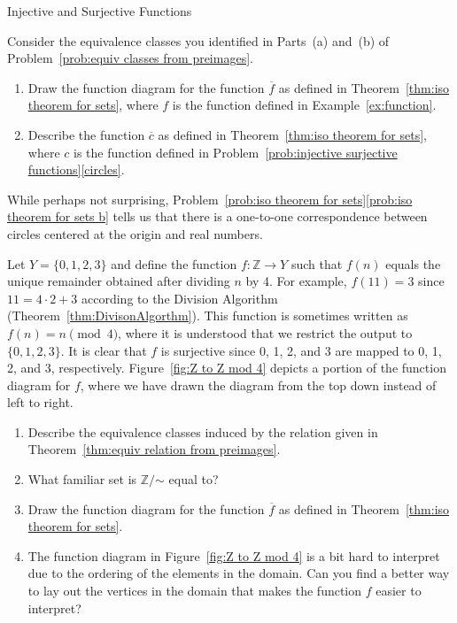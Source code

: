\begin{section}{Injective and Surjective Functions}
\begin{problem}\label{prob:iso theorem for sets}
Consider the equivalence classes you identified in Parts~(a) and~(b) of Problem~\ref{prob:equiv classes from preimages}.
\begin{enumerate}[label=\textrm{(\alph*)}]
\item Draw the function diagram for the function $\overline{f}$ as defined in Theorem~\ref{thm:iso theorem for sets}, where $f$ is the function defined in Example~\ref{ex:function}.
\item\label{prob:iso theorem for sets b} Describe the function $\overline{c}$ as defined in Theorem~\ref{thm:iso theorem for sets}, where $c$ is the function defined in Problem~\ref{prob:injective surjective functions}\ref{circles}.
\end{enumerate}
\end{problem}

While perhaps not surprising, Problem~\ref{prob:iso theorem for sets}\ref{prob:iso theorem for sets b} tells us that there is a one-to-one correspondence between circles centered at the origin and real numbers.

\begin{problem}\label{prob:Z to Z mod 4}
Let $Y=\{0,1,2,3\}$ and define the function $f:\mathbb{Z}\to Y$ such that $f(n)$ equals the unique remainder obtained after dividing $n$ by 4. For example, $f(11)=3$ since $11=4\cdot 2+3$ according to the Division Algorithm (Theorem~\ref{thm:DivisonAlgorthm}). This function is sometimes written as $f(n)=n \pmod{4}$, where it is understood that we restrict the output to $\{0,1,2,3\}$. It is clear that $f$ is surjective since 0, 1, 2, and 3 are mapped to 0, 1, 2, and 3, respectively.  Figure~\ref{fig:Z to Z mod 4} depicts a portion of the function diagram for $f$, where we have drawn the diagram from the top down instead of left to right.
\begin{enumerate}[label=\textrm{(\alph*)}]
\item Describe the equivalence classes induced by the relation given in Theorem~\ref{thm:equiv relation from preimages}.
\item What familiar set is $\mathbb{Z}/\mathord\sim$ equal to?
\item Draw the function diagram for the function $\overline{f}$ as defined in Theorem~\ref{thm:iso theorem for sets}.
\item The function diagram in Figure~\ref{fig:Z to Z mod 4} is a bit hard to interpret due to the ordering of the elements in the domain.  Can you find a better way to lay out the vertices in the domain that makes the function $f$ easier to interpret?
\end{enumerate}
\end{problem}


\end{section}
